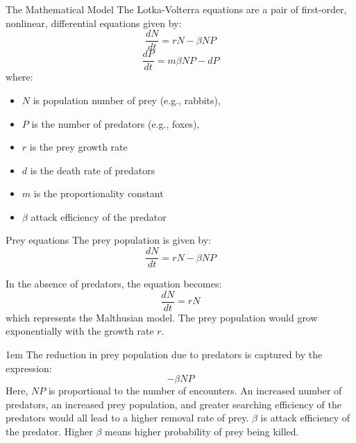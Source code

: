 \begin{frame}{The Mathematical Model}
\small
    The Lotka-Volterra equations are a pair of first-order, nonlinear, differential equations given by:
    \begin{equation}
        \frac{dN}{dt} = rN - \beta NP
    \end{equation}
      \begin{equation}
        \frac{dP}{dt} = m\beta NP - dP
    \end{equation}
    \pause
    where:
    \begin{itemize}
        \item $N$ is population number of prey (e.g., rabbits),
            \pause
        \item $P$ is the number of predators (e.g., foxes),
        \item $r$ is the prey growth rate
            \pause
        \item $d$ is the death rate of predators
            \pause
        \item $m$ is the proportionality constant
            \pause
        \item $\beta$ attack efficiency of the predator
    \end{itemize}
\end{frame}


\begin{frame}{Prey equations}
\footnotesize
    The prey population is given by:
    \begin{equation}
        \frac{dN}{dt} = rN - \beta NP
    \end{equation}
    
    \pause
    In the absence of predators, the equation becomes:
    \begin{equation}
        \frac{dN}{dt} = rN 
    \end{equation}
    which represents the Malthusian model. The prey population would grow exponentially with the growth rate $r$.

    \pause
 \vfill{1em}
    The reduction in prey population due to predators is captured by the expression:
    \begin{equation}
        - \beta NP
    \end{equation}
    \pause
    Here, $NP$ is proportional to the number of encounters. An increased number of predators, an increased prey population, and greater searching efficiency of the predators would all lead to a higher removal rate of prey.
    $\beta$ is attack efficiency of the predator. Higher $\beta$ means higher probability of prey being killed.
\end{frame}


